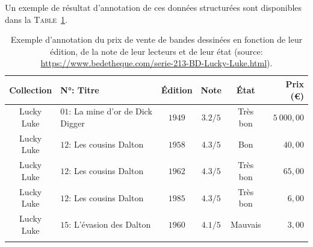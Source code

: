 				Un exemple de résultat d'annotation de ces données structurées sont disponibles dans la \textsc{Table~\ref{table:2.1.2-PRESENTATION-ANNOTATION-EXEMPLES-TABLE-VENTE-BD}}.
				\begin{leftBarExamples}
					\begin{table}[H]  %
						\begin{center}
						\def\arraystretch{0.8}  %
						\begin{tabular}{|c|l|c|c|c|r|}
						
						\hline
						Collection
							& N°: Titre
							& Édition
							& Note
							& État
							& Prix (€)
							\tabularnewline
							\hline
						Lucky Luke
							& $01$: La mine d'or de Dick Digger
							& $1949$
							& $3.2/5$
							& Très bon
							& $5~000,00$
							\tabularnewline
							\hline
						Lucky Luke
							& $12$: Les cousins Dalton
							& $1958$
							& $4.3/5$
							& Bon
							& $40,00$
							\tabularnewline
							\hline
						Lucky Luke
							& $12$: Les cousins Dalton
							& $1962$
							& $4.3/5$
							& Très bon
							& $65,00$
							\tabularnewline
							\hline
						Lucky Luke
							& $12$: Les cousins Dalton
							& $1985$
							& $4.3/5$
							& Très bon
							& $6,00$
							\tabularnewline
							\hline
						Lucky Luke
							& $15$: L'évasion des Dalton
							& $1960$
							& $4.1/5$
							& Mauvais
							& $3,00$
							\tabularnewline
							\hline
						\multicolumn{6}{|c|}{ \shortstack{ ... } }
							\tabularnewline
							\hline
					
						\end{tabular}
						\end{center}
						\caption{
							Exemple d'annotation du prix de vente de bandes dessinées en fonction de leur édition, de la note de leur lecteurs et de leur état (source: \url{https://www.bedetheque.com/serie-213-BD-Lucky-Luke.html}).
						}
						\label{table:2.1.2-PRESENTATION-ANNOTATION-EXEMPLES-TABLE-VENTE-BD}
					\end{table}
				\end{leftBarExamples}
				
			
			
